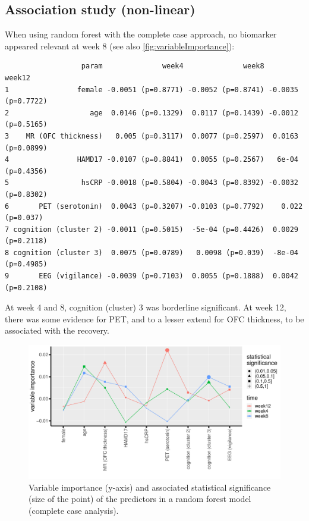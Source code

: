 \documentclass[12pt]{article}
\begin{document}
\subsection{Association study (non-linear)}
\label{sec:org33e03e4}

When using random forest with the complete case approach, no biomarker
appeared relevant at week 8 (see also \autoref{fig:variableImportance}):
\begin{verbatim}
                  param              week4              week8             week12
1                female -0.0051 (p=0.8771) -0.0052 (p=0.8741) -0.0035 (p=0.7722)
2                   age  0.0146 (p=0.1329)  0.0117 (p=0.1439) -0.0012 (p=0.5165)
3    MR (OFC thickness)   0.005 (p=0.3117)  0.0077 (p=0.2597)  0.0163 (p=0.0899)
4                HAMD17 -0.0107 (p=0.8841)  0.0055 (p=0.2567)   6e-04 (p=0.4356)
5                 hsCRP -0.0018 (p=0.5804) -0.0043 (p=0.8392) -0.0032 (p=0.8302)
6       PET (serotonin)  0.0043 (p=0.3207) -0.0103 (p=0.7792)    0.022 (p=0.037)
7 cognition (cluster 2) -0.0011 (p=0.5015)  -5e-04 (p=0.4426)  0.0029 (p=0.2118)
8 cognition (cluster 3)  0.0075 (p=0.0789)   0.0098 (p=0.039)  -8e-04 (p=0.4985)
9       EEG (vigilance) -0.0039 (p=0.7103)  0.0055 (p=0.1888)  0.0042 (p=0.2108)
\end{verbatim}

At week 4 and 8, cognition (cluster) 3 was borderline significant. At
week 12, there was some evidence for PET, and to a lesser extend for
OFC thickness, to be associated with the recovery.

\begin{figure}[!h]
\centering
\includegraphics[trim={0 0 0 0},width=\textwidth]{./../figures/variableImportance.pdf}
\caption{\label{fig:variableImportance}Variable importance (y-axis) and associated statistical significance (size of the point) of the predictors in a random forest model (complete case analysis).}
\end{figure}
\end{document}
